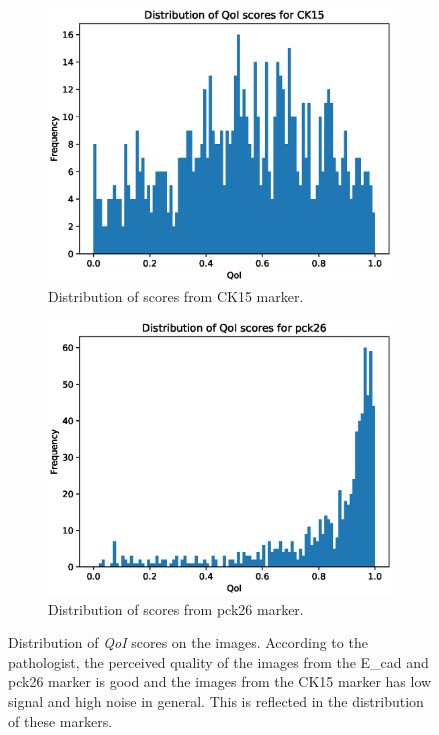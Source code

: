 \begin{figure}[ht!]
\begin{subfigure}{.5\textwidth}
  \centering
  \includegraphics[scale=0.37]{img/SPIE/CK15_probs_smote_pca.eps}
  \caption{Distribution of scores from CK15 marker.}
  \label{fig:ck15_probs}
\end{subfigure}%
\begin{subfigure}{.5\textwidth}
  \centering
  \includegraphics[scale=0.37]{img/SPIE/pck26_probs_smote_pca.eps}
  \caption{Distribution of scores from pck26 marker.}
  \label{fig:pck26_probs}
\end{subfigure}
\caption{Distribution of \textit{QoI} scores on the images. According to the pathologist, the perceived quality of the images from the E\_cad and pck26 marker is good and the images from the CK15 marker has low signal and high noise in general.  This is reflected in the distribution of these markers.}
\label{fig:distribution}
\end{figure}

